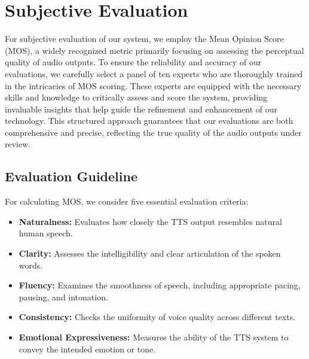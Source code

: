 

\section{Subjective Evaluation}
For subjective evaluation of our system, we employ the Mean Opinion Score (MOS), a widely recognized metric primarily focusing on assessing the perceptual quality of audio outputs. To ensure the reliability and accuracy of our evaluations, we carefully select a panel of ten experts who are thoroughly trained in the intricacies of MOS scoring. These experts are equipped with the necessary skills and knowledge to critically assess and score the system, providing invaluable insights that help guide the refinement and enhancement of our technology. This structured approach guarantees that our evaluations are both comprehensive and precise, reflecting the true quality of the audio outputs under review.

\subsection{Evaluation Guideline}
For calculating MOS, we consider five essential evaluation criteria:
\begin{itemize} \item \textbf{Naturalness:} Evaluates how closely the TTS output resembles natural human speech. \item \textbf{Clarity:} Assesses the intelligibility and clear articulation of the spoken words. \item \textbf{Fluency:} Examines the smoothness of speech, including appropriate pacing, pausing, and intonation. \item \textbf{Consistency:} Checks the uniformity of voice quality across different texts. \item \textbf{Emotional Expressiveness:} Measures the ability of the TTS system to convey the intended emotion or tone. \end{itemize}


